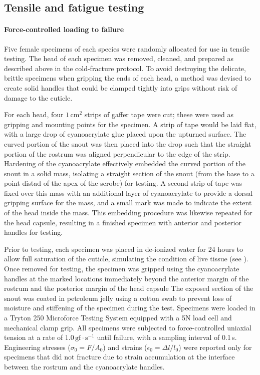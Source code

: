 \documentclass[twocolumn, linenumbers, superscriptaddress, nofootinbib]{revtex4-1}
\begin{document}
		\subsection*{Tensile and fatigue testing}
			\paragraph*{Force-controlled loading to failure}
				Five female specimens of each species were randomly allocated for use in tensile testing.
				The head of each specimen was removed, cleaned, and prepared as described above in the cold-fracture protocol.
				To avoid destroying the delicate, brittle specimens when gripping the ends of each head, a method was devised to create solid handles that could be clamped tightly into grips without risk of damage to the cuticle.
				
				For each head, four $1\,\text{cm}^2$ strips of gaffer tape were cut; these were used as gripping and mounting points for the specimen.
				A strip of tape would be laid flat, with a large drop of cyanoacrylate glue placed upon the upturned surface.
				The curved portion of the snout was then placed into the drop such that the straight portion of the rostrum was aligned perpendicular to the edge of the strip.
				Hardening of the cyanoacrylate effectively embedded the curved portion of the snout in a solid mass, isolating a straight section of the snout (from the base to a point distad of the apex of the scrobe) for testing.
				A second strip of tape was fixed over this mass with an additional layer of cyanoacrylate to provide a dorsal gripping surface for the mass, and a small mark was made to indicate the extent of the head inside the mass.
				This embedding procedure was likewise repeated for the head capsule, resulting in a finished specimen with anterior and posterior handles for testing.
				
				Prior to testing, each specimen was placed in de-ionized water for 24 hours to allow full saturation of the cuticle, simulating the condition of live tissue (see \cite{Klocke2011}).
				Once removed for testing, the specimen was gripped using the cyanoacrylate handles at the marked locations immediately beyond the anterior margin of the rostrum and the posterior margin of the head capsule
				The exposed section of the snout was coated in petroleum jelly using a cotton swab to prevent loss of moisture and stiffening of the specimen during the test.
				Specimens were loaded in a Tryton 250 Microforce Testing System equipped with a 5N load cell and mechanical clamp grip.
				All specimens were subjected to force-controlled uniaxial tension at a rate of $1.0\,\text{gf}\cdot\text{s}^{-1}$ until failure, with a sampling interval of 0.1\,s.
				Engineering stresses ($\sigma_0=F/A_0$) and strains ($\epsilon_0=\Delta{l}/l_0$) were reported only for specimens that did not fracture due to strain accumulation at the interface between the rostrum and the cyanoacrylate handles.
				
\end{document}
